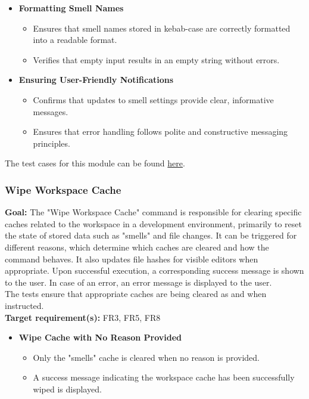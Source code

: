 \documentclass[12pt, titlepage]{article}
\begin{document}
\begin{enumerate}[label={\bf \textcolor{Maroon}{test-SRT-\arabic*}}, wide=0pt, font=\itshape]
\begin{itemize}
    \item \textbf{Formatting Smell Names}
    \begin{itemize}
        \item Ensures that smell names stored in kebab-case are correctly formatted into a readable format.
        \item Verifies that empty input results in an empty string without errors.
    \end{itemize}

    \item \textbf{Ensuring User-Friendly Notifications}
    \begin{itemize}
        \item Confirms that updates to smell settings provide clear, informative messages.
        \item Ensures that error handling follows polite and constructive messaging principles.
    \end{itemize}
\end{itemize}

\noindent The test cases for this module can be found \href{https://github.com/ssm-lab/capstone--sco-vs-code-plugin/blob/plugin-multi-file/test/utils/handleSmellSettings.test.ts}{here}.

\subsubsection{Wipe Workspace Cache}

\textbf{Goal:} The "Wipe Workspace Cache" command is responsible for clearing specific caches related to the workspace in a development environment, primarily to reset the state of stored data such as "smells" and file changes. It can be triggered for different reasons, which determine which caches are cleared and how the command behaves. It also updates file hashes for visible editors when appropriate. Upon successful execution, a corresponding success message is shown to the user. In case of an error, an error message is displayed to the user.\\

\noindent The tests ensure that appropriate caches are being cleared as and when instructed.\\

\noindent \textbf{Target requirement(s):} FR3, FR5, FR8~\cite{SRS} \\

\begin{itemize}
    \item \textbf{Wipe Cache with No Reason Provided}
    \begin{itemize}
        \item Only the "smells" cache is cleared when no reason is provided.
        \item A success message indicating the workspace cache has been successfully wiped is displayed.
    \end{itemize}


\end{itemize}
\end{enumerate}
\end{document}
